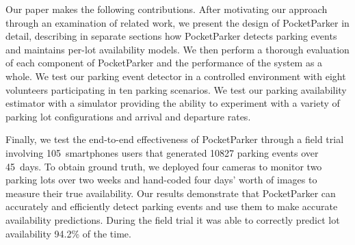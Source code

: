 Our paper makes the following contributions. After motivating our approach
through an examination of related work, we present the design of PocketParker
in detail, describing in separate sections how PocketParker detects parking
events and maintains per-lot availability models. We then perform a thorough
evaluation of each component of PocketParker and the performance of the
system as a whole. We test our parking event detector in a controlled
environment with eight volunteers participating in ten parking scenarios. We
test our parking availability estimator with a simulator providing the
ability to experiment with a variety of parking lot configurations and
arrival and departure rates.

Finally, we test the end-to-end effectiveness of PocketParker through a field
trial involving 105~smartphones users that generated \num{10827} parking
events over 45~days. To obtain ground truth, we deployed four cameras to
monitor two parking lots over two weeks and hand-coded four days' worth of
images to measure their true availability. Our results demonstrate that
PocketParker can accurately and efficiently detect parking events and use
them to make accurate availability predictions. During the field trial it was
able to correctly predict lot availability 94.2\% of the time.
